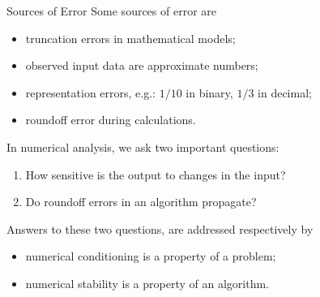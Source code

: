 \documentclass{beamer}
\begin{document}
\begin{frame}{Sources of Error}
    Some sources of error are
    \begin{itemize}
        \item truncation errors in mathematical models;
        \item observed input data are approximate numbers;
        \item representation errors, e.g.: \(1/10\) in binary, \(1/3\) in decimal;
        \item roundoff error during calculations.
    \end{itemize}
    \vspace{1em}
    In numerical analysis, we ask two important questions:
    \begin{enumerate}
        \item How sensitive is the output to changes in the input?
        \item Do roundoff errors in an algorithm propagate?
    \end{enumerate}

    Answers to these two questions, are addressed respectively by
    \begin{itemize}
        \item numerical conditioning is a property of a problem;
        \item numerical stability is a property of an algorithm.
    \end{itemize}
\end{frame}
\end{document}
